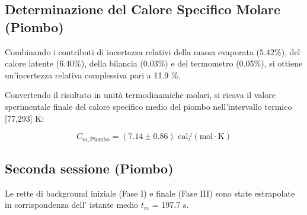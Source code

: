 \documentclass[a4paper,12pt]{article}
\begin{document}
\subsection{Determinazione del Calore Specifico Molare (Piombo)}

Combinando i contributi di incertezza relativi della massa evaporata ($5.42\%$), del calore latente (6.40\%),
della bilancia (0.03\%) e del termometro (0.05\%), si ottiene un'incertezza relativa complessiva pari a 11.9 \%.

Convertendo il risultato in unità termodinamiche molari, si ricava il valore sperimentale finale del calore
specifico medio del piombo nell'intervallo termico [77,293] K:

\begin{equation*}
    C_{m, \text{Piombo}} = (7.14 \pm 0.86)\text{ cal}/(\text{mol}\cdot\text{K})
\end{equation*}
\newpage
\subsection{Seconda sessione (Piombo)}

Le rette di background iniziale (Fase I) e finale (Fase III) sono state estrapolate in corrispondenza dell'
istante medio $t_m$ = 197.7 s.
\end{document}
